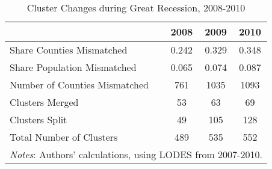 \begin{table}\centering
\caption{Cluster Changes during Great Recession, 2008-2010 \label{tab:recessionsum}}
\begin{tabular}{lccc}
\hline\hline
& 2008 &  2009 & 2010 \\
\hline
Share Counties Mismatched & 0.242 & 0.329 & 0.348 \\
Share Population Mismatched& 0.065 & 0.074 & 0.087 \\
Number of Counties Mismatched & 761 & 1035 & 1093 \\
Clusters Merged & 53 & 63 & 69 \\
Clusters Split & 49 & 105 & 128 \\
Total Number of Clusters & 489 & 535 & 552 \\
\hline
\multicolumn{4}{p{4in}}{\footnotesize \textit{Notes}: Authors' calculations, using LODES from 2007-2010.}\\
\end{tabular}
\end{table}
